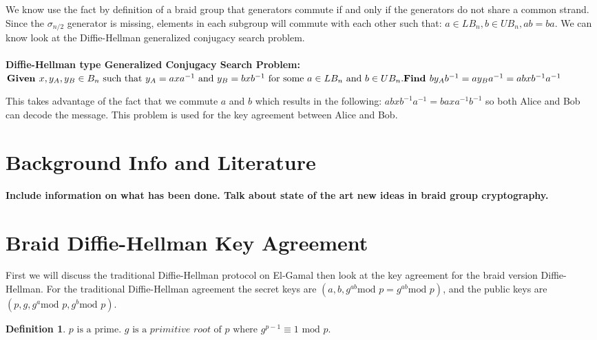 \documentclass{article}
\theoremstyle{definition}
\newtheorem{definition}{Definition}[section]
\begin{document}
We know use the fact by definition of a braid group that generators commute if and only if the generators do not share a common strand. Since the $\sigma_{n/2}$ generator is missing, elements in each subgroup will commute with each other such that: $a \in LB_n, b \in UB_n, ab=ba$. We can know look at the Diffie-Hellman generalized conjugacy search problem.
\\ \\
\textbf{Diffie-Hellman type Generalized Conjugacy Search Problem:} \\ $\textbf{Given }x,y_A, y_B \in B_n \text{ such that }y_A=axa^{-1} \text{ and } y_B=bxb^{-1} \text{ for some }a \in LB_n \text{ and }b \in UB_n. \\ \textbf{Find }by_Ab^{-1}=ay_Ba^{-1}=abxb^{-1}a^{-1}$

This takes advantage of the fact that we commute $a$ and $b$ which results in the following: $abxb^{-1}a^{-1}=baxa^{-1}b^{-1}$ so both Alice and Bob can decode the message. This problem is used for the key agreement between Alice and Bob.

\section{Background Info and Literature}
\textbf{Include information on what has been done. Talk about state of the art new ideas in braid group cryptography.}

\section{Braid Diffie-Hellman Key Agreement}
First we will discuss the traditional Diffie-Hellman protocol on El-Gamal then look at the key agreement for the braid version Diffie-Hellman. For the traditional Diffie-Hellman agreement the secret keys are $(a,b,g^{ab} \text{mod }p=g^{ab} \text{mod }p)$, and the public keys are $(p,g,g^a \text{mod }p,g^b \text{mod }p)$. 

\begin{definition}
$p \text{ is a prime. } g \text{ is a }\textit{primitive root } \text{of }p \text{ where }g^{p-1}\equiv 1 \text{ mod }p. $
\end{definition}
\end{document}

